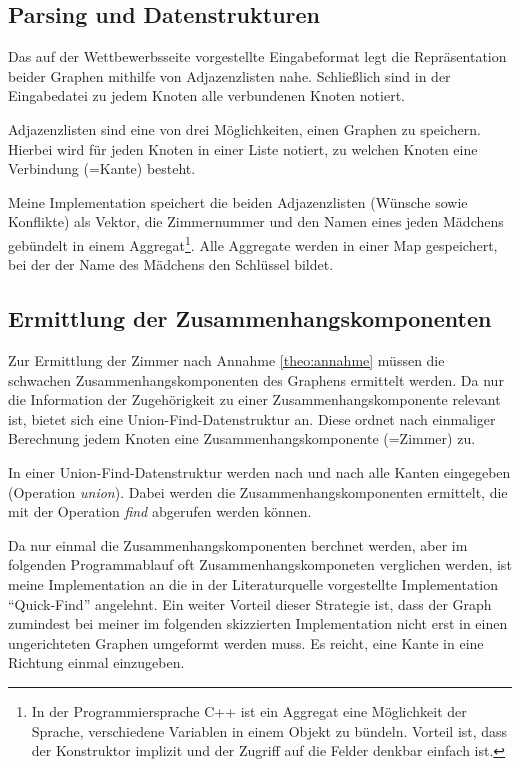 \subsection{Parsing und Datenstrukturen}
Das auf der Wettbewerbsseite vorgestellte Eingabeformat legt die Repräsentation
beider Graphen mithilfe von Adjazenzlisten nahe.
Schließlich sind in der Eingabedatei zu jedem Knoten alle verbundenen Knoten notiert.

Adjazenzlisten sind eine von drei Möglichkeiten, einen Graphen zu speichern. Hierbei wird 
für jeden Knoten in einer Liste notiert, zu welchen Knoten eine Verbindung (=Kante)
besteht.

Meine Implementation speichert die beiden Adjazenzlisten (Wünsche sowie Konflikte)
als Vektor, die Zimmernummer und den Namen eines jeden Mädchens gebündelt in einem
Aggregat\footnote{In der Programmiersprache C++ ist ein Aggregat eine Möglichkeit der
Sprache, verschiedene Variablen in einem Objekt zu bündeln. Vorteil ist, dass der
Konstruktor implizit und der Zugriff auf die Felder denkbar einfach ist.}.
Alle Aggregate werden in einer Map gespeichert, bei der der Name des Mädchens den 
Schlüssel bildet.

\subsection{Ermittlung der Zusammenhangskomponenten}
Zur Ermittlung der Zimmer nach Annahme \ref{theo:annahme} müssen die schwachen
Zusammenhangskomponenten des Graphens ermittelt werden. 
Da nur die Information der Zugehörigkeit zu einer Zusammenhangskomponente relevant ist,
bietet sich eine Union-Find-Datenstruktur\autocite[S. 238]{Sedgewick2014} an.
Diese ordnet nach einmaliger Berechnung jedem Knoten eine
Zusammenhangskomponente (=Zimmer) zu.

In einer Union-Find-Datenstruktur werden nach und nach alle Kanten eingegeben
(Operation \textit{union}). Dabei werden die Zusammenhangskomponenten ermittelt, die
mit der Operation \textit{find} abgerufen werden können.

Da nur einmal die Zusammenhangskomponenten berchnet werden, aber im folgenden
Programmablauf oft Zusammenhangskomponeten verglichen werden, 
ist meine Implementation an die in der Literaturquelle vorgestellte Implementation 
"`Quick-Find"'\autocite[S. 245]{Sedgewick2014} angelehnt.
Ein weiter Vorteil dieser Strategie ist, dass der Graph zumindest bei meiner
im folgenden skizzierten Implementation nicht erst in einen ungerichteten Graphen
umgeformt werden muss.
Es reicht, eine Kante in eine Richtung einmal einzugeben.

